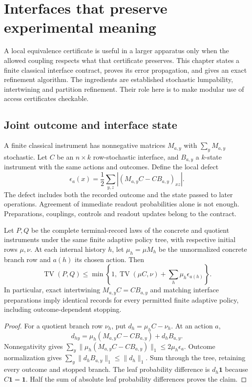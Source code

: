 \chapter{Interfaces that preserve experimental meaning}
\label{completion:composition}

A local equivalence certificate is useful in a larger apparatus only when
the allowed coupling respects what that certificate preserves. This chapter
states a finite classical interface contract, proves its error propagation,
and gives an exact refinement algorithm. The ingredients are established
stochastic lumpability, intertwining and partition refinement. Their role
here is to make modular use of access certificates checkable.

\section{Joint outcome and interface state}
A finite classical instrument has nonnegative matrices $M_{a,y}$ with
$\sum_yM_{a,y}$ stochastic. Let $C$ be an $n\times k$ row-stochastic
interface, and $B_{a,y}$ a $k$-state instrument with the same actions and
outcomes. Define the local defect
\[
 \epsilon_a(x)=\frac12\sum_{y,z}
       |(M_{a,y}C-CB_{a,y})_{xz}|.
\]
The defect includes both the recorded outcome and the state passed to later
operations. Agreement of immediate readout probabilities alone is not enough.
Preparations, couplings, controls and readout updates belong to the contract.

\begin{theorem}
Let $P,Q$ be the complete terminal-record laws of the concrete and quotient
instruments under the same finite adaptive policy tree, with respective
initial rows $\mu,\nu$. At each internal history $h$, let
$\mu_h=\mu M_h$ be the unnormalized concrete branch row and $a(h)$ its
chosen action. Then
\[
 \operatorname{TV}(P,Q)\leq
 \min\left\{1,\operatorname{TV}(\mu C,\nu)
                  +\sum_h\mu_h\epsilon_{a(h)}\right\}.
\]
In particular, exact intertwining $M_{a,y}C=CB_{a,y}$ and matching interface
preparations imply identical records for every permitted finite adaptive
policy, including outcome-dependent stopping.
\end{theorem}
\begin{proof}
For a quotient branch row $\nu_h$, put $d_h=\mu_hC-\nu_h$. At an action $a$,
\[
 d_{hy}=\mu_h(M_{a,y}C-CB_{a,y})+d_hB_{a,y}.
\]
Nonnegativity gives
$\sum_y\|\mu_h(M_{a,y}C-CB_{a,y})\|_1\leq2\mu_h\epsilon_a$.
Outcome normalization gives
$\sum_y\|d_hB_{a,y}\|_1\leq\|d_h\|_1$.
Sum through the tree, retaining every outcome and stopped branch. The leaf
probability difference is $d_h\mathbf1$ because $C\mathbf1=\mathbf1$.
Half the sum of absolute leaf probability differences proves the claim.
\end{proof}

